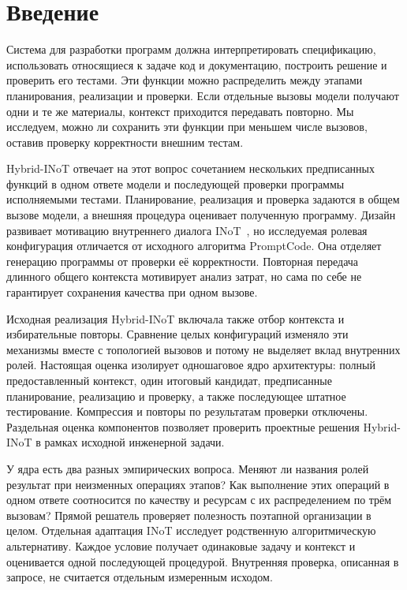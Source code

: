 \section{Введение}
\label{sec:heldout-context}
Система для разработки программ должна интерпретировать спецификацию, использовать относящиеся к задаче код и документацию, построить решение и проверить его тестами. Эти функции можно распределить между этапами планирования, реализации и проверки. Если отдельные вызовы модели получают одни и те же материалы, контекст приходится передавать повторно. Мы исследуем, можно ли сохранить эти функции при меньшем числе вызовов, оставив проверку корректности внешним тестам.

Hybrid-INoT отвечает на этот вопрос сочетанием нескольких предписанных функций в одном ответе модели и последующей проверки программы исполняемыми тестами. Планирование, реализация и проверка задаются в общем вызове модели, а внешняя процедура оценивает полученную программу. Дизайн развивает мотивацию внутреннего диалога INoT~\cite{sun2025inot}, но исследуемая ролевая конфигурация отличается от исходного алгоритма PromptCode. Она отделяет генерацию программы от проверки её корректности. Повторная передача длинного общего контекста мотивирует анализ затрат, но сама по себе не гарантирует сохранения качества при одном вызове.

Исходная реализация Hybrid-INoT включала также отбор контекста и избирательные повторы. Сравнение целых конфигураций изменяло эти механизмы вместе с топологией вызовов и потому не выделяет вклад внутренних ролей. Настоящая оценка изолирует одношаговое ядро архитектуры: полный предоставленный контекст, один итоговый кандидат, предписанные планирование, реализацию и проверку, а также последующее штатное тестирование. Компрессия и повторы по результатам проверки отключены. Раздельная оценка компонентов позволяет проверить проектные решения Hybrid-INoT в рамках исходной инженерной задачи.

У ядра есть два разных эмпирических вопроса. Меняют ли названия ролей результат при неизменных операциях этапов? Как выполнение этих операций в одном ответе соотносится по качеству и ресурсам с их распределением по трём вызовам? Прямой решатель проверяет полезность поэтапной организации в целом. Отдельная адаптация INoT исследует родственную алгоритмическую альтернативу. Каждое условие получает одинаковые задачу и контекст и оценивается одной последующей процедурой. Внутренняя проверка, описанная в запросе, не считается отдельным измеренным исходом.

